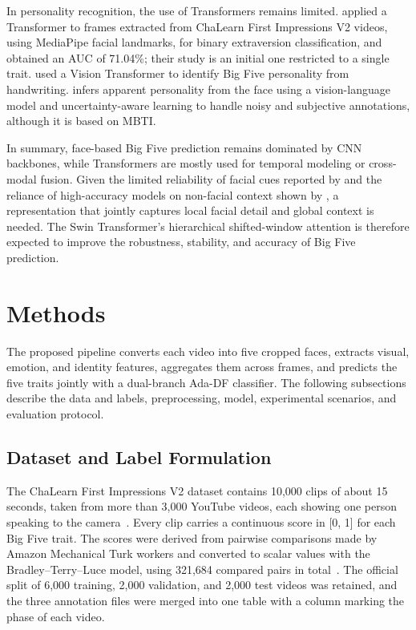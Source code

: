 \documentclass[10pt,a4paper,twocolumn]{article}
\begin{document}
In personality recognition, the use of Transformers remains limited. \cite{Goncalves} applied a Transformer to frames extracted from ChaLearn First Impressions V2 videos, using MediaPipe facial landmarks, for binary extraversion classification, and obtained an AUC of 71.04\%; their study is an initial one restricted to a single trait. \cite{Shupyliuk} used a Vision Transformer to identify Big Five personality from handwriting. \cite{Chen} infers apparent personality from the face using a vision-language model and uncertainty-aware learning to handle noisy and subjective annotations, although it is based on MBTI.

In summary, face-based Big Five prediction remains dominated by CNN backbones, while Transformers are mostly used for temporal modeling or cross-modal fusion. Given the limited reliability of facial cues reported by \cite{Wolffhechel2014-ut} and the reliance of high-accuracy models on non-facial context shown by \cite{Ilmini2024-vh}, a representation that jointly captures local facial detail and global context is needed. The Swin Transformer’s hierarchical shifted-window attention is therefore expected to improve the robustness, stability, and accuracy of Big Five prediction.


\section{Methods}
The proposed pipeline converts each video into five cropped faces, extracts visual, emotion, and identity features, aggregates them across frames, and predicts the five traits jointly with a dual-branch Ada-DF classifier. The following subsections describe the data and labels, preprocessing, model, experimental scenarios, and evaluation protocol.

\subsection{Dataset and Label Formulation}
The ChaLearn First Impressions V2 dataset contains 10,000 clips of about 15 seconds, taken from more than 3,000 YouTube videos, each showing one person speaking to the camera~\cite{ponce}. Every clip carries a continuous score in [0, 1] for each Big Five trait. The scores were derived from pairwise comparisons made by Amazon Mechanical Turk workers and converted to scalar values with the Bradley--Terry--Luce model, using 321,684 compared pairs in total~\cite{ponce,bt}. The official split of 6,000 training, 2,000 validation, and 2,000 test videos was retained, and the three annotation files were merged into one table with a column marking the phase of each video.
\end{document}

